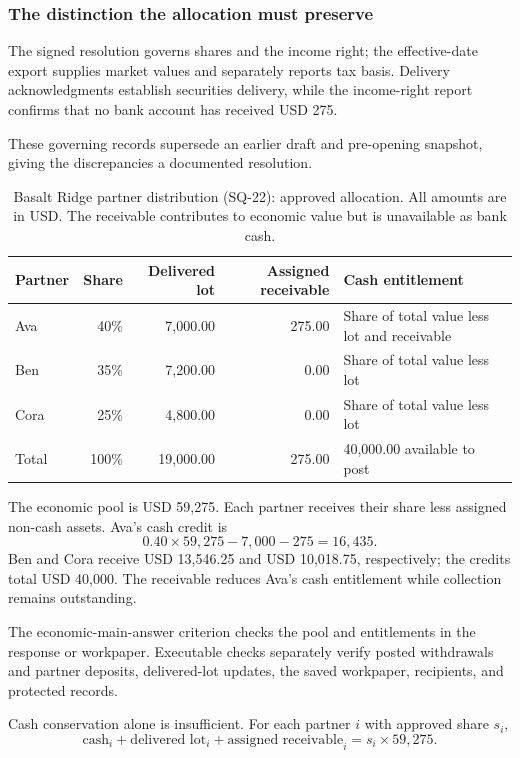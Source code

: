 \documentclass[11pt,letterpaper]{article}
\begin{document}
\subsubsection{The distinction the allocation must preserve}
The signed resolution governs shares and the income right; the effective-date export supplies market values and separately reports tax basis. Delivery acknowledgments establish securities delivery, while the income-right report confirms that no bank account has received USD 275.

These governing records supersede an earlier draft and pre-opening snapshot, giving the discrepancies a documented resolution.

\begin{table}[H]\centering\small
\caption{Basalt Ridge partner distribution (SQ-22): approved allocation. All amounts are in USD. The receivable contributes to economic value but is unavailable as bank cash.}\label{tab:basalt-inputs}
\begin{tabularx}{\linewidth}{@{}lrrrY@{}}\toprule
Partner & Share & Delivered lot & Assigned receivable & Cash entitlement\\\midrule
Ava & 40\% & 7,000.00 & 275.00 & Share of total value less lot and receivable\\
Ben & 35\% & 7,200.00 & 0.00 & Share of total value less lot\\
Cora & 25\% & 4,800.00 & 0.00 & Share of total value less lot\\\midrule
Total & 100\% & 19,000.00 & 275.00 & 40,000.00 available to post\\\bottomrule
\end{tabularx}
\end{table}

The economic pool is USD 59,275. Each partner receives their share less assigned non-cash assets. Ava's cash credit is
\begin{equation}
0.40\times59{,}275-7{,}000-275=16{,}435.
\end{equation}
Ben and Cora receive USD 13,546.25 and USD 10,018.75, respectively; the credits total USD 40,000. The receivable reduces Ava's cash entitlement while collection remains outstanding.

The economic-main-answer criterion checks the pool and entitlements in the response or workpaper. Executable checks separately verify posted withdrawals and partner deposits, delivered-lot updates, the saved workpaper, recipients, and protected records.

Cash conservation alone is insufficient. For each partner $i$ with approved share $s_i$,
\begin{equation}
\text{cash}_i+\text{delivered lot}_i+\text{assigned receivable}_i
=s_i\times59{,}275.
\end{equation}
\end{document}
